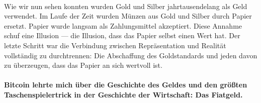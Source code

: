 \paragraph{}
Wie wir nun sehen konnten wurden Gold und Silber jahrtausendelang als Geld
verwendet. Im Laufe der Zeit wurden Münzen aus Gold und Silber durch Papier
ersetzt. Papier wurde langsam als Zahlungsmittel akzeptiert. Diese Annahme
schuf eine Illusion --- die Illusion, dass das Papier selbst einen Wert hat. Der
letzte Schritt war die Verbindung zwischen Repräsentation und Realität
vollständig zu durchtrennen: Die Abschaffung des Goldstandards und jeden davon
zu überzeugen, dass das Papier an sich wertvoll ist.

\paragraph{Bitcoin lehrte mich über die Geschichte des Geldes und den größten
Taschenspielertrick in der Geschichte der Wirtschaft: Das Fiatgeld.}

%
%
%
%
